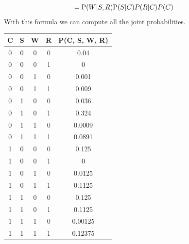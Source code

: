 \documentclass[12pt, a4paper]{report}
\begin{document}
\begin{example}
\[\begin{aligned}
                                        &= \textnormal{P}(W|S,R)\textnormal{P}(S|C)P(R|C)P(C)
        \end{aligned}
        \]
        With this formula we can compute all the joint probabilities.
        \begin{table}[H]
            \centering
            \begin{tabular}{cccc|c}
            \hline
            \textbf{C} & \textbf{S} & \textbf{W} & \textbf{R} & \textbf{P(C, S, W, R)} \\ \hline
            0          & 0          & 0          & 0          & 0.04                \\
            0          & 0          & 0          & 1          & 0                   \\
            0          & 0          & 1          & 0          & 0.001               \\
            0          & 0          & 1          & 1          & 0.009               \\
            0          & 1          & 0          & 0          & 0.036               \\
            0          & 1          & 0          & 1          & 0.324               \\
            0          & 1          & 1          & 0          & 0.0009              \\
            0          & 1          & 1          & 1          & 0.0891              \\
            1          & 0          & 0          & 0          & 0.125               \\
            1          & 0          & 0          & 1          & 0                   \\
            1          & 0          & 1          & 0          & 0.0125              \\
            1          & 0          & 1          & 1          & 0.1125              \\
            1          & 1          & 0          & 0          & 0.125               \\
            1          & 1          & 0          & 1          & 0.1125              \\
            1          & 1          & 1          & 0          & 0.00125             \\
            1          & 1          & 1          & 1          & 0.12375             \\ \hline
            \end{tabular}
        \end{table}
    \end{example}
\end{document}
